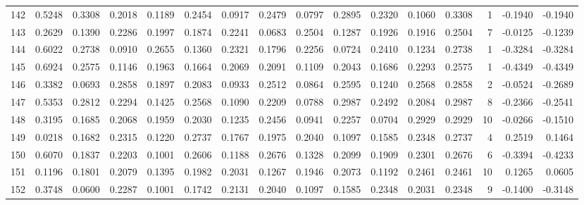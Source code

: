 \begin{tabular}{lrrrrrrrrrrrrrrr}
142 &      0.5248 &  0.3308 &  0.2018 &  0.1189 &  0.2454 &  0.0917 &  0.2479 &  0.0797 &  0.2895 &  0.2320 &   0.1060 &     0.3308 &      1 &                   -0.1940 &                    -0.1940 \\
143 &      0.2629 &  0.1390 &  0.2286 &  0.1997 &  0.1874 &  0.2241 &  0.0683 &  0.2504 &  0.1287 &  0.1926 &   0.1916 &     0.2504 &      7 &                   -0.0125 &                    -0.1239 \\
144 &      0.6022 &  0.2738 &  0.0910 &  0.2655 &  0.1360 &  0.2321 &  0.1796 &  0.2256 &  0.0724 &  0.2410 &   0.1234 &     0.2738 &      1 &                   -0.3284 &                    -0.3284 \\
145 &      0.6924 &  0.2575 &  0.1146 &  0.1963 &  0.1664 &  0.2069 &  0.2091 &  0.1109 &  0.2043 &  0.1686 &   0.2293 &     0.2575 &      1 &                   -0.4349 &                    -0.4349 \\
146 &      0.3382 &  0.0693 &  0.2858 &  0.1897 &  0.2083 &  0.0933 &  0.2512 &  0.0864 &  0.2595 &  0.1240 &   0.2568 &     0.2858 &      2 &                   -0.0524 &                    -0.2689 \\
147 &      0.5353 &  0.2812 &  0.2294 &  0.1425 &  0.2568 &  0.1090 &  0.2209 &  0.0788 &  0.2987 &  0.2492 &   0.2084 &     0.2987 &      8 &                   -0.2366 &                    -0.2541 \\
148 &      0.3195 &  0.1685 &  0.2068 &  0.1959 &  0.2030 &  0.1235 &  0.2456 &  0.0941 &  0.2257 &  0.0704 &   0.2929 &     0.2929 &     10 &                   -0.0266 &                    -0.1510 \\
149 &      0.0218 &  0.1682 &  0.2315 &  0.1220 &  0.2737 &  0.1767 &  0.1975 &  0.2040 &  0.1097 &  0.1585 &   0.2348 &     0.2737 &      4 &                    0.2519 &                     0.1464 \\
150 &      0.6070 &  0.1837 &  0.2203 &  0.1001 &  0.2606 &  0.1188 &  0.2676 &  0.1328 &  0.2099 &  0.1909 &   0.2301 &     0.2676 &      6 &                   -0.3394 &                    -0.4233 \\
151 &      0.1196 &  0.1801 &  0.2079 &  0.1395 &  0.1982 &  0.2031 &  0.1267 &  0.1946 &  0.2073 &  0.1192 &   0.2461 &     0.2461 &     10 &                    0.1265 &                     0.0605 \\
152 &      0.3748 &  0.0600 &  0.2287 &  0.1001 &  0.1742 &  0.2131 &  0.2040 &  0.1097 &  0.1585 &  0.2348 &   0.2031 &     0.2348 &      9 &                   -0.1400 &                    -0.3148 \\

\end{tabular}
